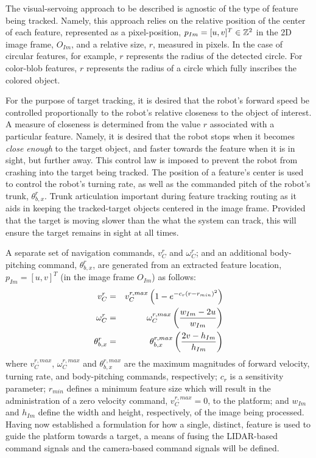 			The visual-servoing approach to be described is agnostic of the type of feature being tracked. Namely, this approach relies on the relative position of the center of each feature, represented as a pixel-position, $p_{Im} = [u,v]^{T} \in {\Bbb Z}^{2}$ in the 2D image frame, $O_{Im}$, and a relative size, $r$, measured in pixels. In the case of circular features, for example, $r$ represents the radius of the detected circle. For color-blob features, $r$ represents the radius of a circle which fully inscribes the colored object.

			For the purpose of target tracking, it is desired that the robot's forward speed be controlled proportionally to the robot's relative closeness to the object of interest. A measure of closeness is determined from the value $r$ associated with a particular feature. Namely, it is desired that the robot stops when it becomes \emph{close enough} to the target object, and faster towards the feature when it is in sight, but further away. This control law is imposed to prevent the robot from crashing into the target being tracked. The position of a feature's center is used to control the robot's turning rate, as well as the commanded pitch of the robot's trunk, $\theta_{b,x}^{r}$. Trunk articulation important during feature tracking routing as it aids in keeping the tracked-target objects centered in the image frame. Provided that the target is moving slower than the what the system can track, this will ensure the target remains in sight at all times.

			A separate set of navigation commands, $v_{C}^{r}$ and $\omega_{C}^{r}$; and an additional body-pitching command, $\theta_{b,x}^{r}$,  are generated from an extracted feature location, $p_{Im} = [u,v]^{T}$ (in the image frame $O_{Im}$) as follows: 
				\begin{eqnarray}
					v_{C}^{r} 			& = & v_{C}^{r,max} \left( 1 - e^{ -c_{r} \left( r-r_{min} \right)^{2} } \right) 	\nonumber 	\\
					\omega_{C}^{r} 	& = & \omega_{C}^{r,max} \left(\frac{ w_{Im} - 2 u  }{ w_{Im} } \right)		\nonumber 	\\
					\theta_{b,x}^{r}	& = & \theta_{b,x}^{r,max} \left( \frac{ 2 v - h_{Im} }{ h_{Im} } \right) 		
				\end{eqnarray}
			where $v_{C}^{r,max}$, $\omega_{C}^{r,max}$ and $\theta_{b,x}^{r,max}$ are the maximum magnitudes of forward velocity, turning rate, and body-pitching commands, respectively; $c_{r}$ is a sensitivity parameter; $r_{min}$ defines a minimum feature size which will result in the administration of a zero velocity command, $v_{C}^{r,max}=0$, to the platform; and $w_{Im}$ and $h_{Im}$ define the width and height, respectively, of the image being processed. Having now established a formulation for how a single, distinct, feature is used to guide the platform towards a target, a means of fusing the LIDAR-based command signals and the camera-based command signals will be defined.

